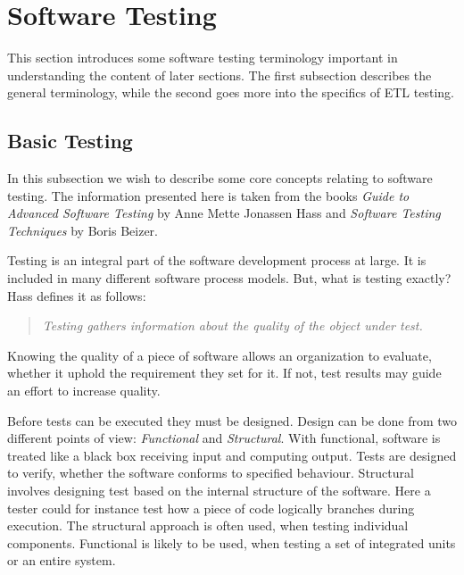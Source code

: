 \section{Software Testing}\label{sect:btesting}
This section introduces some software testing terminology important in understanding the content of later sections. The first subsection describes the general terminology, while the second goes more into the specifics of ETL testing.

\subsection{Basic Testing}
In this subsection we wish to describe some core concepts relating to software testing. The information presented here is taken from the books \textit{Guide to Advanced Software Testing} by Anne Mette Jonassen Hass\cite{Hass} and \textit{Software Testing Techniques} by Boris Beizer\cite{Beizer}.

Testing is an integral part of the software development process at large. It is included in many different software process models. But, what is testing exactly? Hass defines it as follows:
\begin{quotation} \textit{Testing gathers information about the quality of the object under test.}\end{quotation}
Knowing the quality of a piece of software allows an organization to evaluate, whether it uphold the requirement they set for it. If not, test results may guide an effort to increase quality.

Before tests can be executed they must be designed. Design can be done from two different points of view: \emph{Functional} and \emph{Structural}. With functional, software is treated like a black box receiving input and computing output. Tests are designed to verify, whether the software conforms to specified behaviour. Structural involves designing test based on the internal structure of the software. Here a tester could for instance test how a piece of code logically branches during execution. The structural approach is often used, when testing individual components. Functional is likely to be used, when testing a set of integrated units or an entire system.

